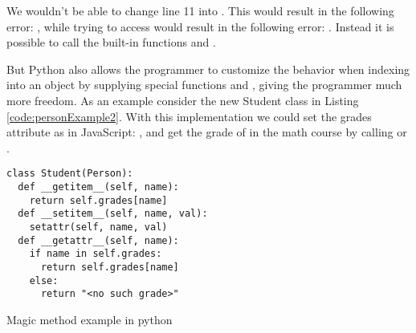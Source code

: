 We wouldn't be able to change line 11 into . This would result in the following error: 
, while trying to access  would result in the following error: 
. Instead it is possible to call the built-in functions 
 and . 

But Python also allows the programmer to customize the behavior when indexing into an object by supplying special functions 
 and , giving the programmer much more freedom. 
As an example consider the new Student class in Listing \ref{code:personExample2}. 
With this implementation we could set the grades attribute as in JavaScript: , 
and get the grade of  in the math course by calling  or .

\begin{listing}[H]
\begin{verbatim}
class Student(Person):
  def __getitem__(self, name):
    return self.grades[name]
  def __setitem__(self, name, val):
    setattr(self, name, val)
  def __getattr__(self, name):
    if name in self.grades:
      return self.grades[name]
    else:
      return "<no such grade>"
\end{verbatim}
	\caption{Magic method example in python}
	\label{code:personExample2}
\end{listing}
